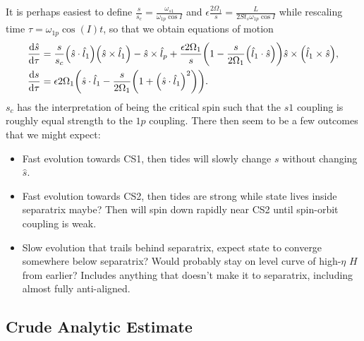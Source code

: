 \documentclass[11pt,
        usenames, %
        dvipsnames %
    ]{article}
\newcommand*{\rd}[2]{\frac{\mathrm{d}#1}{\mathrm{d}#2}}
\DeclarePairedDelimiter\p{\lparen}{\rparen}
\begin{document}
It is perhaps easiest to define $\frac{s}{s_c} =
\frac{\omega_{s1}}{\omega_{1p}\cos I}$ and $\epsilon\frac{2\Omega_1}{s} =
\frac{L}{2St_s \omega_{1p}\cos I}$ while rescaling time $\tau =
\omega_{1p}\cos(I) t$, so that we obtain equations of motion
\begin{align}
    \rd{\hat{s}}{\tau}
        &= \frac{s}{s_c}\p*{\hat{s} \cdot \hat{l}_1}\p*{\hat{s} \times \hat{l}_1}
            - \hat{s} \times \hat{l}_p
            + \frac{\epsilon 2\Omega_1}{s}
                \p*{1 - \frac{s}{2\Omega_1}\p*{\hat{l}_1 \cdot \hat{s}}}
                    \hat{s} \times \p*{\hat{l}_1 \times \hat{s}},\\
    \rd{s}{\tau}
        &= \epsilon 2\Omega_1 \p*{\hat{s} \cdot \hat{l}_1 - \frac{s}{2\Omega_1}\p*{1
            + \p*{\hat{s} \cdot \hat{l}_1}^2}}.
\end{align}
$s_c$ has the interpretation of being the critical spin such that the $s1$
coupling is roughly equal strength to the $1p$ coupling. There then seem to be a
few outcomes that we might expect:
\begin{itemize}
    \item Fast evolution towards CS1, then tides will slowly change $s$ without
        changing $\hat{s}$.

    \item Fast evolution towards CS2, then tides are strong while state lives
        inside separatrix maybe? Then will spin down rapidly near CS2 until
        spin-orbit coupling is weak.

    \item Slow evolution that trails behind separatrix, expect state to converge
        somewhere below separatrix? Would probably stay on level curve of
        high-$\eta$ $H$ from earlier? Includes anything that doesn't make it to
        separatrix, including almost fully anti-aligned.
\end{itemize}

\subsection{Crude Analytic Estimate}
\end{document}
